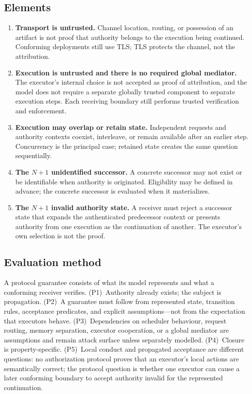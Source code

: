 \documentclass[conference]{IEEEtran}
\begin{document}
\subsection{Elements}
\begin{enumerate}
\item[\textbf{T1}] \textbf{Transport is untrusted.} Channel location, routing, or possession of an artifact is not proof that authority belongs to the execution being continued. Conforming deployments still use TLS; TLS protects the channel, not the attribution.
\item[\textbf{T2}] \textbf{Execution is untrusted and there is no required global mediator.} The executor's internal choice is not accepted as proof of attribution, and the model does not require a separate globally trusted component to separate execution steps. Each receiving boundary still performs trusted verification and enforcement.
\item[\textbf{T3}] \textbf{Execution may overlap or retain state.} Independent requests and authority contexts coexist, interleave, or remain available after an earlier step. Concurrency is the principal case; retained state creates the same question sequentially.
\item[\textbf{T4}] \textbf{The $N{+}1$ unidentified successor.} A concrete successor may not exist or be identifiable when authority is originated. Eligibility may be defined in advance; the concrete successor is evaluated when it materializes.
\item[\textbf{T5}] \textbf{The $N{+}1$ invalid authority state.} A receiver must reject a successor state that expands the authenticated predecessor context or presents authority from one execution as the continuation of another. The executor's own selection is not the proof.
\end{enumerate}

\subsection{Evaluation method}
A protocol guarantee consists of what its model represents and what a conforming receiver verifies. (P1)~Authority already exists; the subject is propagation. (P2)~A guarantee must follow from represented state, transition rules, acceptance predicates, and explicit assumptions---not from the expectation that executors behave. (P3)~Dependencies on scheduler behaviour, request routing, memory separation, executor cooperation, or a global mediator are assumptions and remain attack surface unless separately modelled. (P4)~Closure is property-specific. (P5)~Local conduct and propagated acceptance are different questions: no authorization protocol proves that an executor's local actions are semantically correct; the protocol question is whether one executor can cause a later conforming boundary to accept authority invalid for the represented continuation.
\end{document}
